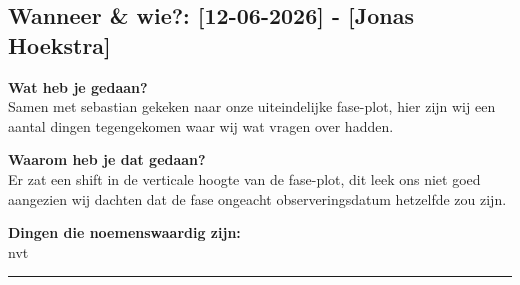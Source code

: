 
\subsection*{Wanneer \& wie?: [12-06-2026] - [Jonas Hoekstra]}

\textbf{Wat heb je gedaan?}\\
Samen met sebastian gekeken naar onze uiteindelijke fase-plot, hier zijn wij een aantal dingen tegengekomen waar wij wat vragen over hadden. 
\vspace{0.3cm} 

\noindent \textbf{Waarom heb je dat gedaan?}\\
Er zat een shift in de verticale hoogte van de fase-plot, dit leek ons niet goed aangezien wij dachten dat de fase ongeacht observeringsdatum hetzelfde zou zijn.

\noindent \textbf{Dingen die noemenswaardig zijn:}\\
nvt


\vspace{0.5cm}
\hrule 
\vspace{0.5cm}
